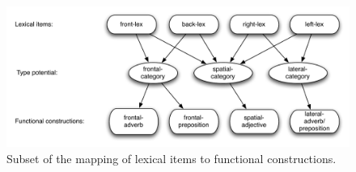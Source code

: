 
\begin{figure}
\includegraphics[width=\columnwidth]{figs/lexicals-type-potentials-cats}
\caption{Subset of the mapping of lexical items to functional constructions.}
\label{f:lexicals-type-potentials-cats}
\end{figure}

